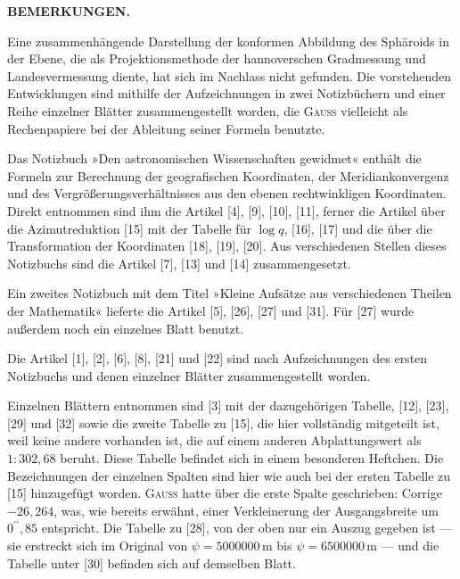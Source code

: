 \thispagestyle{empty}
\vspace*{1.6\baselineskip}
\begin{center}\large\textbf{BEMERKUNGEN.}\end{center}
{\small
Eine zusammenhängende Darstellung der konformen Abbildung des Sphäroids in der Ebene,
die als Projektionsmethode der hannoverschen Gradmessung und Landesvermessung diente,
hat sich im Nachlass nicht gefunden. Die vorstehenden Entwicklungen sind mithilfe der
Aufzeichnungen in zwei Notizbüchern und einer Reihe einzelner Blätter zusammengestellt
worden, die \textsc{Gauss} vielleicht als Rechenpapiere bei der Ableitung seiner Formeln benutzte.

Das Notizbuch »Den astronomischen Wissenschaften gewidmet« enthält die Formeln zur
Berechnung der geografischen Koordinaten, der Meridiankonvergenz und des
Vergrößerungsverhältnisses aus den ebenen rechtwinkligen Koordinaten. Direkt entnommen
sind ihm die Artikel [4], [9], [10], [11], ferner die Artikel über die Azimutreduktion [15]
mit der Tabelle für \(\log q\), [16], [17] und die über die Transformation der Koordinaten
[18], [19], [20]. Aus verschiedenen Stellen dieses Notizbuchs sind die Artikel [7], [13]
und [14] zusammengesetzt.

Ein zweites Notizbuch mit dem Titel »Kleine Aufsätze aus verschiedenen Theilen der
Mathematik« lieferte die Artikel [5], [26], [27] und [31]. Für [27] wurde außerdem noch
ein einzelnes Blatt benutzt.

Die Artikel [1], [2], [6], [8], [21] und [22] sind nach Aufzeichnungen des ersten
Notizbuchs und denen einzelner Blätter zusammengestellt worden.

Einzelnen Blättern entnommen sind [3] mit der dazugehörigen Tabelle, [12], [23], [29]
und [32] sowie die zweite Tabelle zu [15], die hier vollständig mitgeteilt ist, weil keine
andere vorhanden ist, die auf einem anderen Abplattungswert als \(1:302{,}68\) beruht.
Diese Tabelle befindet sich in einem besonderen Heftchen. Die Bezeichnungen der einzelnen
Spalten sind hier wie auch bei der ersten Tabelle zu [15] hinzugefügt worden.
\textsc{Gauss} hatte über die erste Spalte geschrieben: Corrige \(-26{,}264\), was,
wie bereits erwähnt, einer Verkleinerung der Ausgangsbreite um \(0^{\prime\prime}{,}85\)
entspricht. Die Tabelle zu [28], von der oben nur ein Auszug gegeben ist --- sie
erstreckt sich im Original von \(\psi=5000000\,\mathrm m\) bis \(\psi=6500000\,\mathrm m\) ---
und die Tabelle unter [30] befinden sich auf demselben Blatt.

}
